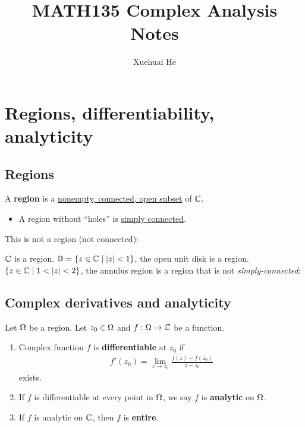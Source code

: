 \documentclass[12pt]{article}
\begin{document}
\title{MATH135 Complex Analysis Notes}
\author{Xuehuai He}
\maketitle

\hypertarget{toc}{}
{\parskip=0.05in
\tableofcontents}

\spl

\newpage
\pagestyle{updated}

\section{Regions, differentiability, analyticity}

\subsection{Regions}
 A \textbf{region} is a \uline{nonempty, connected, open subset} of $\mathbb{C}$.
\begin{itemize}
    \item A region without ``holes'' is \uline{simply connected}.
\end{itemize}

\noneg This is not a region (not connected): 

\eg $\mathbb{C}$ is a region.
\eg $\mathbb{D} = \{z\in \mathbb{C}\mid |z|<1\}$, the open unit disk is a region.
\eg $\{z\in \C \mid 1<|z|<2\}$, the annulus region is a region that is not \textit{simply-connected}:

\subsection{Complex derivatives and analyticity}

 Let $\Omega$ be a region. Let $z_0\in \Omega$ and $f:\Omega \to \mathbb{C}$ be a function.
\begin{enumerate}
    \item Complex function $f$ is \textbf{differentiable} at $z_0$ if \begin{align*}
        f'(z_0)=\lim_{z\to z_0}\frac{f(z)-f(z_0)}{z-z_0}
    \end{align*}
    exists.

    \item If $f$ is differentiable at every point in $\Omega$, we say $f$ is \textbf{analytic} on $\Omega$.
    \item If $f$ is analytic on $\mathbb{C}$, then $f$ is \textbf{entire}.
\end{enumerate}
\end{document}
